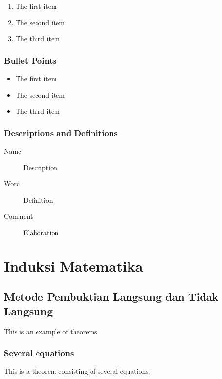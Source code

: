\documentclass[11pt,fleqn]{book} %
\begin{document}
\begin{enumerate}
\item The first item
\item The second item
\item The third item
\end{enumerate}

\subsection{Bullet Points}

\begin{itemize}
\item The first item
\item The second item
\item The third item
\end{itemize}

\subsection{Descriptions and Definitions}

\begin{description}
\item[Name] Description
\item[Word] Definition
\item[Comment] Elaboration
\end{description}


\chapter{Induksi Matematika}

\section{Metode Pembuktian Langsung dan Tidak Langsung}

This is an example of theorems.

\subsection{Several equations}
This is a theorem consisting of several equations.
\end{document}
